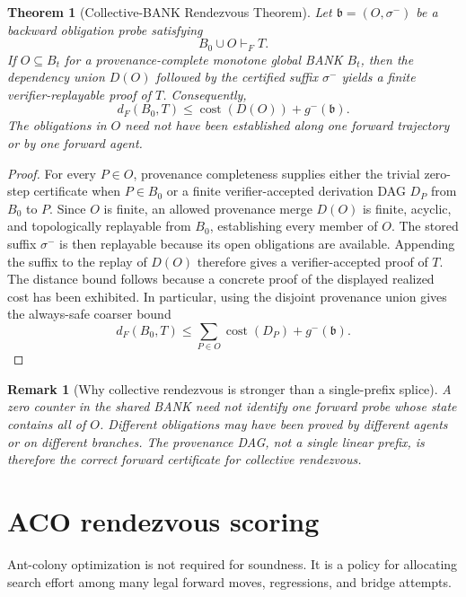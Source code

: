 \documentclass[11pt]{article}
\newtheorem{theorem}[definition]{Theorem}
\newtheorem{remark}[definition]{Remark}
\newcommand{\cost}{\operatorname{cost}}
\begin{document}
\begin{theorem}[Collective-BANK Rendezvous Theorem]
Let $\mathfrak b=(O,\sigma^-)$ be a backward obligation probe satisfying
\[
B_0\cup O\vdash_F T.
\]
If $O\subseteq B_t$ for a provenance-complete monotone global BANK $B_t$, then the dependency union $D(O)$ followed by the certified suffix $\sigma^-$ yields a finite verifier-replayable proof of $T$. Consequently,
\[
d_F(B_0,T)\le \cost(D(O))+g^-(\mathfrak b).
\]
The obligations in $O$ need not have been established along one forward trajectory or by one forward agent.
\end{theorem}

\begin{proof}
For every $P\in O$, provenance completeness supplies either the trivial zero-step certificate when $P\in B_0$ or a finite verifier-accepted derivation DAG $D_P$ from $B_0$ to $P$. Since $O$ is finite, an allowed provenance merge $D(O)$ is finite, acyclic, and topologically replayable from $B_0$, establishing every member of $O$. The stored suffix $\sigma^-$ is then replayable because its open obligations are available. Appending the suffix to the replay of $D(O)$ therefore gives a verifier-accepted proof of $T$. The distance bound follows because a concrete proof of the displayed realized cost has been exhibited. In particular, using the disjoint provenance union gives the always-safe coarser bound
\[
d_F(B_0,T)\le \sum_{P\in O}\cost(D_P)+g^-(\mathfrak b).
\]
\end{proof}

\begin{remark}[Why collective rendezvous is stronger than a single-prefix splice]
A zero counter in the shared BANK need not identify one forward probe whose state contains all of $O$. Different obligations may have been proved by different agents or on different branches. The provenance DAG, not a single linear prefix, is therefore the correct forward certificate for collective rendezvous.
\end{remark}

\section{ACO rendezvous scoring}

Ant-colony optimization is not required for soundness. It is a policy for allocating search effort among many legal forward moves, regressions, and bridge attempts.
\end{document}
